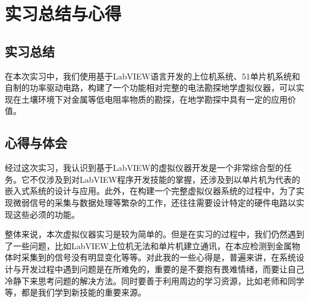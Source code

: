 \documentclass[UTF8]{article}
\begin{document}
%
\section{实习总结与心得}
\subsection{实习总结}
在本次实习中，我们使用基于LabVIEW语言开发的上位机系统、51单片机系统和自制的功率驱动电路，构建了一个功能相对完整的电法勘探地学虚拟仪器，可以实现在土壤环境下对金属等低电阻率物质的勘探，在地学勘探中具有一定的应用价值。

\subsection{心得与体会}
经过这次实习，我认识到基于LabVIEW的虚拟仪器开发是一个非常综合型的任务。它不仅涉及到对LabVIEW程序开发技能的掌握，还涉及到以单片机为代表的嵌入式系统的设计与应用。此外，在构建一个完整虚拟仪器系统的过程中，为了实现微弱信号的采集与数据处理等繁杂的工作，还往往需要设计特定的硬件电路以实现这些必须的功能。

整体来说，本次虚拟仪器实习是较为简单的。但是在实习的过程中，我们仍然遇到了一些问题，比如LabVIEW上位机无法和单片机建立通讯，在本应检测到金属物体时采集到的信号没有明显变化等等。对此我的一些心得是，普遍来讲，在系统设计与开发过程中遇到问题是在所难免的，重要的是不要抱有畏难情绪，而要让自己冷静下来思考问题的解决方法。同时要善于利用周边的学习资源，比如老师和同学等，都是我们学到新技能的重要来源。
\end{document}
